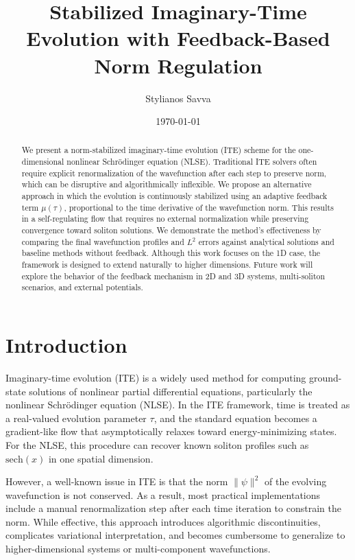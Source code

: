 \documentclass[12pt]{article}
\title{Stabilized Imaginary-Time Evolution with Feedback-Based Norm Regulation}
\author{Stylianos Savva}
\date{\today}
\begin{document}
\maketitle

\begin{abstract}
We present a norm-stabilized imaginary-time evolution (ITE) scheme for the one-dimensional nonlinear Schrödinger equation (NLSE). Traditional ITE solvers often require explicit renormalization of the wavefunction after each step to preserve norm, which can be disruptive and algorithmically inflexible. We propose an alternative approach in which the evolution is continuously stabilized using an adaptive feedback term $\mu(\tau)$, proportional to the time derivative of the wavefunction norm. This results in a self-regulating flow that requires no external normalization while preserving convergence toward soliton solutions. We demonstrate the method’s effectiveness by comparing the final wavefunction profiles and $L^2$ errors against analytical solutions and baseline methods without feedback. Although this work focuses on the 1D case, the framework is designed to extend naturally to higher dimensions. Future work will explore the behavior of the feedback mechanism in 2D and 3D systems, multi-soliton scenarios, and external potentials.
\end{abstract}

\section{Introduction}

Imaginary-time evolution (ITE) is a widely used method for computing ground-state solutions of nonlinear partial differential equations, particularly the nonlinear Schrödinger equation (NLSE). In the ITE framework, time is treated as a real-valued evolution parameter $\tau$, and the standard equation becomes a gradient-like flow that asymptotically relaxes toward energy-minimizing states. For the NLSE, this procedure can recover known soliton profiles such as $\mathrm{sech}(x)$ in one spatial dimension.

However, a well-known issue in ITE is that the norm $\|\psi\|^2$ of the evolving wavefunction is not conserved. As a result, most practical implementations include a manual renormalization step after each time iteration to constrain the norm. While effective, this approach introduces algorithmic discontinuities, complicates variational interpretation, and becomes cumbersome to generalize to higher-dimensional systems or multi-component wavefunctions.
\end{document}
